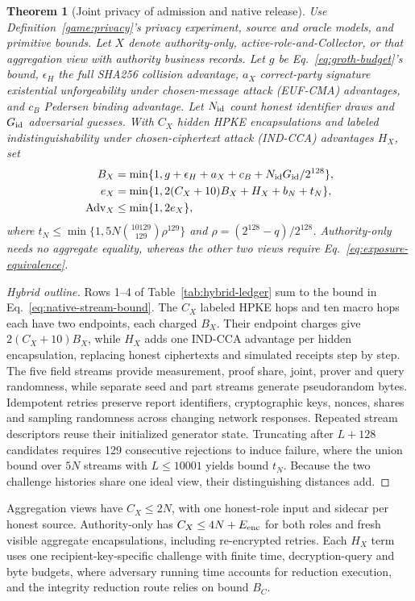\documentclass[conference,compsoc]{IEEEtran}
\theoremstyle{definition}
\numberwithin{equation}{section}
\numberwithin{table}{section}
\numberwithin{figure}{section}
\theoremstyle{plain}
\newtheorem{theorem}{Theorem}[section]
\newtheorem{theorem}{Theorem}
\begin{document}
\begin{theorem}[Joint privacy of admission and native release]
\label{thm:native-single-batch-privacy}
Use Definition~\ref{game:privacy}'s privacy experiment, source and oracle models, and primitive bounds.
Let \(X\) denote authority-only, active-role-and-Collector, or that aggregation view with authority business records.
Let \(g\) be Eq.~\eqref{eq:groth-budget}'s bound, \(\epsilon_H\) the full SHA256 collision advantage, \(a_X\) correct-party signature existential unforgeability under chosen-message attack (EUF-CMA) advantages, and \(c_B\) Pedersen binding advantage. Let \(N_{\rm id}\) count honest identifier draws and \(G_{\rm id}\) adversarial guesses. With \(C_X\) hidden HPKE encapsulations and labeled indistinguishability under chosen-ciphertext attack (IND-CCA) advantages \(H_X\), set
\begin{align}
 B_X&=\min\{1,g+\epsilon_H+a_X+c_B+N_{\rm id}G_{\rm id}/2^{128}\},
 \label{eq:route-bound}\\
 e_X&=\min\{1,2(C_X+10)B_X+H_X+b_N+t_N\},\\
 \operatorname{Adv}_X&\le\min\{1,2e_X\},
 \label{eq:native-joint-bound}
\end{align}
where \(t_N\le\min\{1,5N\binom{10129}{129}\rho^{129}\}\) and
\(\rho=(2^{128}-q)/2^{128}\). Authority-only needs no aggregate equality,
whereas the other two views require Eq.~\eqref{eq:exposure-equivalence}.
\end{theorem}
\begin{proof}[Hybrid outline]
Rows 1--4 of Table~\ref{tab:hybrid-ledger} sum to the bound in
Eq.~\eqref{eq:native-stream-bound}. The \(C_X\) labeled HPKE hops and ten
macro hops each have two endpoints, each charged \(B_X\). Their endpoint
charges give \(2(C_X+10)B_X\), while \(H_X\) adds one IND-CCA advantage per
hidden encapsulation, replacing honest ciphertexts and simulated receipts step by step.
The five field streams provide measurement, proof share, joint, prover and
query randomness, while separate seed and part streams generate pseudorandom bytes.
Idempotent retries preserve report identifiers, cryptographic keys, nonces, shares and sampling randomness
across changing network responses. Repeated stream descriptors reuse their initialized generator state.
Truncating after \(L+128\) candidates requires 129 consecutive rejections to induce failure,
where the union bound over \(5N\) streams with \(L\le10001\) yields bound \(t_N\).
Because the two challenge histories share one ideal view, their distinguishing distances add.
\end{proof}
Aggregation views have \(C_X\le2N\), with one honest-role input and sidecar
per honest source. Authority-only has \(C_X\le4N+E_{\rm enc}\) for both
roles and fresh visible aggregate encapsulations, including re-encrypted
retries. Each \(H_X\) term uses one recipient-key-specific challenge with
finite time, decryption-query and byte budgets, where adversary running time accounts for reduction execution,
and the integrity reduction route relies on bound \(B_C\).
\end{document}
